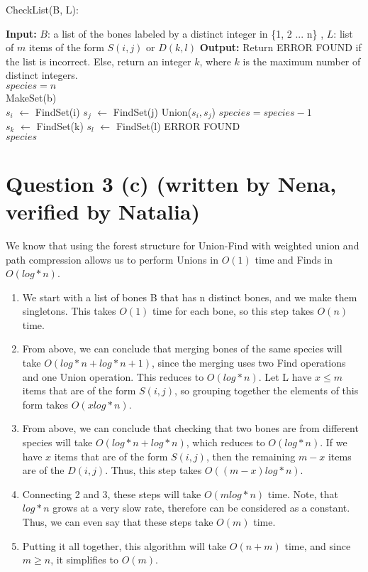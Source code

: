 \documentclass{article}
\begin{document}
\begin{algorithm} [H]
\caption{CheckList(B, L):}
\begin{algorithmic}[1]
\State \textbf{Input:} \( B \): a list of the bones labeled by a distinct integer in \{1, 2 ... n\} , \( L \): list of \(m\) items of the form \(S(i, j)\) or \(D(k, l)\) 
\State \textbf{Output:} Return ERROR FOUND if the list is incorrect. Else, return an integer \(k\), where \(k\) is the maximum number of distinct integers.
\\
\State $species = n$
\\
    \State MakeSet(b)
\EndFor
\\
    \State \(s_i\) $\gets$ FindSet(i)
    \State \(s_j\) $\gets$ FindSet(j)
        \State Union(\(s_i, s_j\))
        \State $species = species - 1$
    \EndIf
\EndFor
\\
    \State \(s_k\) $\gets$ FindSet(k)
    \State \(s_l\) $\gets$ FindSet(l)
        \State \Return ERROR FOUND
    \EndIf
\EndFor
\\
\Return $species$

\end{algorithmic}
\end{algorithm}

\section*{Question 3 (c)  (written by Nena, verified by Natalia)}
We know that using the forest structure for Union-Find with weighted union and path compression allows us to perform Unions in \(O(1)\) time and Finds in \(O(log*n)\). 
 \begin{enumerate}
    \item We start with a list of bones B that has n distinct bones, and we make them singletons. This takes \(O(1)\) time for each bone, so this step takes \(O(n)\) time.
    \item From above, we can conclude that merging bones of the same species will take \(O(log*n + log*n + 1)\), since the merging uses two Find operations and one Union operation. This reduces to \(O(log*n)\). Let L have $x \leq m$ items that are of the form \(S(i, j)\), so grouping together the elements of this form takes \(O(xlog*n)\).
    \item From above, we can conclude that checking that two bones are from different species will take \(O(log*n + log*n)\), which reduces to \(O(log*n)\). If we have  $x$ items that are of the form \(S(i, j)\), then the remaining $m-x$ items are of the \(D(i, j)\). Thus, this step takes \(O((m-x)log*n)\).
    \item Connecting 2 and 3, these steps will take \(O(mlog*n)\) time. Note, that $log*n$ grows at a very slow rate, therefore can be considered as a constant. Thus, we can even say that these steps take \(O(m)\) time. 
    \item Putting it all together, this algorithm will take \(O(n + m)\) time, and since $m \geq n$, it simplifies to \(O(m)\). 
 \end{enumerate}
\end{document}
